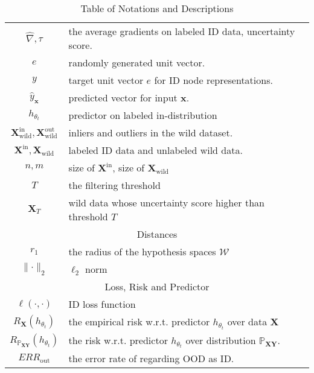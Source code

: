 \begin{table}[h!]
\begin{tabular}{c p{10cm}}
        \( \widehat{\nabla}, \tau \) & the average gradients on labeled ID data, uncertainty score. \\
        $e$ & randomly generated unit vector.\\
        \( y \) & target unit vector $e$ for ID node representations. \\
        \(  \widehat{y}_{\mathbf{x}} \) & predicted vector for input $\mathbf{x}$. \\  
        $h_{\theta_t}$ & predictor on labeled in-distribution\\
        $\boldsymbol{X}_{\text{wild}}^{\text{in}}, \boldsymbol{X}_{\text{wild}}^{\text{out}}$ & inliers and outliers in the wild dataset.\\
        $\boldsymbol{X}^{\text{in}}, \boldsymbol{X}_{\text{wild}}$ & labeled ID data and unlabeled wild data.\\
        $n, m$ & size of $\boldsymbol{X}^{\text{in}}$, size of $\boldsymbol{X}_{\text{wild}}$\\
        $T$ & the filtering threshold\\
        $\boldsymbol{X}_{T}$ & wild data whose uncertainty score higher than threshold $T$\\
        \hline
       \multicolumn{2}{c}{ \cellcolor{gray!30}Distances}\\
        \hline
        $r_1$ &  the radius of the hypothesis spaces $\mathcal{W}$\\
        $\parallel \cdot \parallel_2 $ & $\ell_2$ norm\\
        \hline
       \multicolumn{2}{c}{ \cellcolor{gray!30}Loss, Risk and Predictor}\\
        \hline
        $\ell(\cdot,\cdot)$ & ID loss function\\
        $R_{\boldsymbol{X}}(h_{\theta_t})$ & the empirical risk w.r.t. predictor $h_{\theta_t}$ over data $\boldsymbol{X}$\\
        $R_{\mathbb{P}_{\boldsymbol{XY}}}(h_{\theta_t})$ & the risk w.r.t. predictor $h_{\theta_t}$ over distribution $\mathbb{P}_{\boldsymbol{XY}}$.\\
        $ERR_{\text{out}}$ & the error rate of regarding OOD as ID.\\
        
        
        \hline
    \end{tabular}
    \caption{Table of Notations and Descriptions}
    \label{tab:notation}
\end{table}

